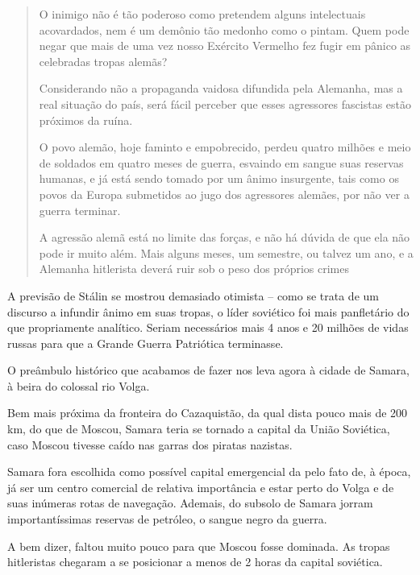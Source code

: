 \begin{quote}
O inimigo não é tão poderoso como pretendem alguns intelectuais
acovardados, nem é um demônio tão medonho como o pintam. Quem pode negar
que mais de uma vez nosso Exército Vermelho fez fugir em pânico as
celebradas tropas alemãs?

Considerando não a propaganda vaidosa difundida pela Alemanha, mas a
real situação do país, será fácil perceber que esses agressores
fascistas estão próximos da ruína.

O povo alemão, hoje faminto e empobrecido, perdeu quatro milhões e meio
de soldados em quatro meses de guerra, esvaindo em sangue suas reservas
humanas, e já está sendo tomado por um ânimo insurgente, tais como os
povos da Europa submetidos ao jugo dos agressores alemães, por não ver a
guerra terminar.

A agressão alemã está no limite das forças, e não há dúvida de que ela
não pode ir muito além. Mais alguns meses, um semestre, ou talvez um
ano, e a Alemanha hitlerista deverá ruir sob o peso dos próprios
crimes

\end{quote}

A previsão de Stálin se mostrou demasiado otimista -- como se trata de
um discurso a infundir ânimo em suas tropas, o líder soviético foi mais
panfletário do que propriamente analítico. Seriam necessários mais 4
anos e 20 milhões de vidas russas para que a Grande Guerra Patriótica
terminasse.

O preâmbulo histórico que acabamos de fazer nos leva agora à cidade de
Samara, à beira do colossal rio Volga.

Bem mais próxima da fronteira do Cazaquistão, da qual dista pouco mais
de 200 km, do que de Moscou, Samara teria se tornado a capital da União
Soviética, caso Moscou tivesse caído nas garras dos piratas nazistas.

Samara fora escolhida como possível capital emergencial da  pelo
fato de, à época, já ser um centro comercial de relativa importância e
estar perto do Volga e de suas inúmeras rotas de navegação. Ademais, do
subsolo de Samara jorram importantíssimas reservas de petróleo, o sangue
negro da guerra.

A bem dizer, faltou muito pouco para que Moscou fosse dominada. As
tropas hitleristas chegaram a se posicionar a menos de 2 horas da
capital soviética.

